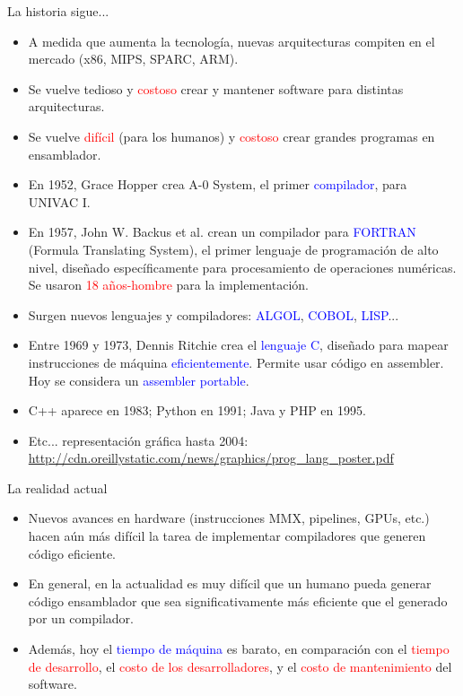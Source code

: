 \documentclass{beamer} %
\newcommand{\blue}[1]{\textcolor{blue}{#1}}
\newcommand{\red}[1]{\textcolor{red}{#1}}
\begin{document}
\begin{frame}{La historia sigue...}
  \scriptsize{\begin{itemize}
      \item<1-> A medida que aumenta la tecnología, nuevas arquitecturas compiten en el mercado (x86, MIPS, SPARC, ARM).
      \item<2-> Se vuelve tedioso y \red{costoso} crear y mantener software para distintas arquitecturas.
      \item<3-> Se vuelve \red{difícil} (para los humanos) y \red{costoso} crear grandes programas en ensamblador.
      \item<4-> En 1952, Grace Hopper crea A-0 System, el primer \blue{compilador}, para UNIVAC I.
      \item<5-> En 1957, John W. Backus et al. crean un compilador para \blue{FORTRAN} (Formula Translating System), el primer lenguaje de programación de alto nivel, diseñado específicamente para procesamiento de operaciones numéricas.\\
      Se usaron \red{18 años-hombre} para la implementación.
      \item<6-> Surgen nuevos lenguajes y compiladores: \blue{ALGOL}, \blue{COBOL}, \blue{LISP}...
      \item<7-> Entre 1969 y 1973, Dennis Ritchie crea el \blue{lenguaje C}, diseñado para mapear instrucciones de máquina \blue{eficientemente}. Permite usar código en assembler.\\
      Hoy se considera un \blue{assembler portable}.
      \item<8-> C++ aparece en 1983; Python en 1991; Java y PHP en 1995.
      \item<9-> Etc... representación gráfica hasta 2004: \url{http://cdn.oreillystatic.com/news/graphics/prog_lang_poster.pdf}
  \end{itemize}}
\end{frame}

\begin{frame}{La realidad actual}
  \begin{itemize}
    \item<1-> Nuevos avances en hardware (instrucciones MMX, pipelines, GPUs, etc.) hacen aún más difícil la tarea de implementar compiladores que generen código eficiente.
    \item<2-> En general, en la actualidad es muy difícil que un humano pueda generar código ensamblador que sea significativamente más eficiente que el generado por un compilador.
    \item<3-> Además, hoy el \blue{tiempo de máquina} es barato, en comparación con el \red{tiempo de desarrollo}, el \red{costo de los desarrolladores}, y el \red{costo de mantenimiento} del software.
  \end{itemize}
\end{frame}
\end{document}
